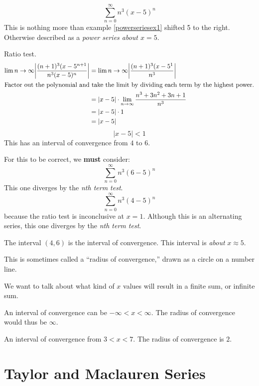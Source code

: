 \begin{ex}
  \[\sum^\infty_{n=0} n^3 (x-5)^n\]
  This is nothing more than example \ref{powerseriesex1} shifted 5 to the right.
  Otherwise described as a \emph{power series about \(x=5\)}.
  \begin{sol}
    Ratio test.
    \begin{align*}
      \lim{n\to\infty} \bigg| \frac{(n+1)^3 (x-5^{n+1}}{n^3 (x-5)^n} \bigg|
      &=
      \lim{n\to\infty} \bigg| \frac{(n+1)^3 (x-5^{1}}{n^3} \bigg| \\
      \intertext{Factor out the polynomial and take the limit by dividing each
      term by the highest power.}
      &= | x-5| \cdot \lim_{n\to \infty} \frac{n^3+3n^2+3n+1}{n^3} \\
      &= |x-5| \cdot 1 \\
      &= |x-5|
    \end{align*}
    \[ |x-5| < 1 \]
    This has an interval of convergence from $4$ to $6$.
    \begin{note}
      For this to be correct, we \textbf{must} consider:
      \[ \sum^\infty_{n=0} n^3 (6-5)^n \]
      This one diverges by the \emph{nth term test}.
      \[ \sum^\infty_{n=0} n^3 (4-5)^n \]
      because the ratio test is inconclusive at $x=1$.
      Although this is an alternating series, this one diverges by the \emph{nth
      term test}.

      The interval $(4, 6)$ is the interval of convergence. This interval is
      \emph{about} $x \approx 5$.

      This is sometimes called a ``radius of convergence,'' drawn as a circle on
      a number line.
    \end{note}
  \end{sol}
\end{ex}
We want to talk about what kind of $x$ values will result in a finite sum, or
infinite sum.
\begin{note}
  An interval of convergence can be $-\infty<x<\infty$. The radius of
  convergence would thus be $\infty$.
\end{note}
\begin{ex}
  An interval of convergence from $3 < x < 7$. The radius of convergence is $2$.
\end{ex}

\section{Taylor and Maclauren Series}

